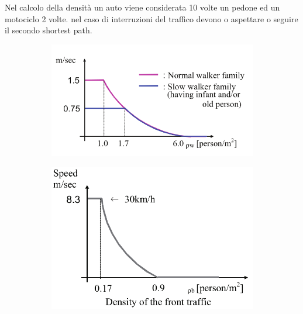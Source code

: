 \vspace*{5mm}

Nel calcolo della densità un auto viene considerata 10 volte un pedone ed un motociclo 2 volte.
nel caso di interruzioni del traffico devono o aspettare o seguire il secondo shortest path.

\begin{figure}[ht]
    \centering
    \begin{subfigure}{0.45\textwidth}
        \includegraphics[width=\textwidth]{images/speed_GOTO.png}
        \caption{}
        \label{fig:adaads}
    \end{subfigure}
    \begin{subfigure}{0.45\textwidth}
        \includegraphics[width=\textwidth]{images/speed_GOTO_motocicli.png}
        \caption{}
        \label{fig:ssadada}
    \end{subfigure}
    \begin{subfigure}{0.45\textwidth}

\end{subfigure}
\end{figure}

